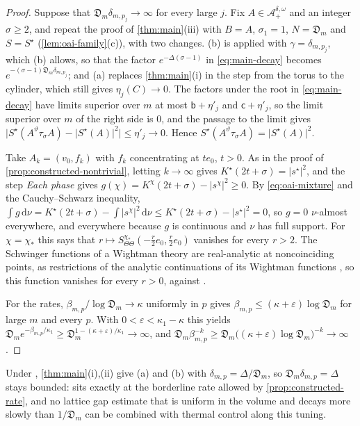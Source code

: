 \documentclass[11pt,a4paper]{amsart}
\theoremstyle{definition}
\theoremstyle{remark}
\numberwithin{equation}{section}
\newcommand{\abs}[1]{\lvert #1\rvert}      %
\newcommand{\dd}{\,\mathrm{d}}             %
\newcommand{\Mcirc}{\text{\upshape(M$^{\circ}$)}}   %
\newcommand{\Den}{\mathfrak D}            %
\begin{document}
\begin{proof}
Suppose that $\Den_m\delta_{m,p_j}\to\infty$ for every large $j$. Fix $A\in\mathcal A_+^{\delta,\omega}$ and an integer $\sigma\ge2$, and repeat the proof of \cref{thm:main}(iii) with $B=A$, $\sigma_1=1$, $N=\Den_m$ and $S=S^\star$ (\cref{lem:oai-family}(c)), with two changes. (b) is applied with $\gamma=\delta_{m,p_j}$, which (b) allows, so that the factor $e^{-\Delta(\sigma-1)}$ in \eqref{eq:main-decay} becomes $e^{-(\sigma-1)\Den_m\delta_{m,p_j}}$; and (a) replaces \cref{thm:main}(i) in the step from the torus to the cylinder, which still gives $\eta_j(C)\to0$. The factors under the root in \eqref{eq:main-decay} have limits superior over $m$ at most $\mathsf b+\eta'_j$ and $\mathsf c+\eta'_j$, so the limit superior over $m$ of the right side is $0$, and the passage to the limit gives $\abs{S^\star(A^\vartheta\tau_\sigma A)-\abs{S^\star(A)}^2}\le\eta'_j\to0$. Hence $S^\star(A^\vartheta\tau_\sigma A)=\abs{S^\star(A)}^2$.

Take $A_k=(v_0,f_k)$ with $f_k$ concentrating at $te_0$, $t>0$. As in the proof of \cref{prop:constructed-nontrivial}, letting $k\to\infty$ gives $K^\star(2t+\sigma)=\abs{s^\star}^2$, and the step \emph{Each phase} gives $g(\chi)=K^\chi(2t+\sigma)-\abs{s^\chi}^2\ge0$. By \eqref{eq:oai-mixture} and the Cauchy--Schwarz inequality, $\int g\dd\nu=K^\star(2t+\sigma)-\int\abs{s^\chi}^2\dd\nu\le K^\star(2t+\sigma)-\abs{s^\star}^2=0$, so $g=0$ $\nu$-almost everywhere, and everywhere because $g$ is continuous and $\nu$ has full support. For $\chi=\chi_*$ this says that $r\mapsto S^{\chi_*}_{\Theta\Theta}(-\frac r2e_0,\frac r2e_0)$ vanishes for every $r>2$. The Schwinger functions of a Wightman theory are real-analytic at noncoinciding points, as restrictions of the analytic continuations of its Wightman functions \cite{osterwalder1973}, so this function vanishes for every $r>0$, against \cite[Theorem~7.1]{ymgroup2026}.

For the rates, $\beta_{m,p}/\log \Den_m\to\kappa$ uniformly in $p$ gives $\beta_{m,p}\le(\kappa+\varepsilon)\log \Den_m$ for large $m$ and every $p$. With $0<\varepsilon<\kappa_1-\kappa$ this yields $\Den_m e^{-\beta_{m,p}/\kappa_1}\ge \Den_m^{1-(\kappa+\varepsilon)/\kappa_1}\to\infty$, and $\Den_m\beta_{m,p}^{-k}\ge \Den_m\bigl((\kappa+\varepsilon)\log \Den_m\bigr)^{-k}\to\infty$.
\end{proof}

Under \Mcirc{}, \cref{thm:main}(i),(ii) give (a) and (b) with $\delta_{m,p}=\Delta/\Den_m$, so $\Den_m\delta_{m,p}=\Delta$ stays bounded: \Mcirc{} sits exactly at the borderline rate allowed by \cref{prop:constructed-rate}, and no lattice gap estimate that is uniform in the volume and decays more slowly than $1/\Den_m$ can be combined with thermal control along this tuning.
\end{document}
